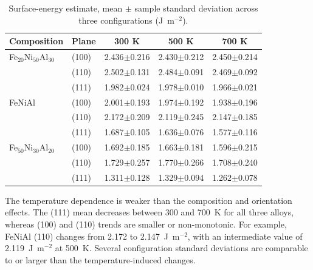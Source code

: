\begin{table}[t]
\centering
\caption{Surface-energy estimate, mean $\pm$ sample standard deviation across three configurations (J~m$^{-2}$).}
\label{tab:gamma}
\scriptsize
\begin{tabular}{llccc}
\toprule
Composition & Plane & 300 K & 500 K & 700 K \\
\midrule
Fe$_{20}$Ni$_{50}$Al$_{30}$ &(100)&2.436$\pm$0.216&2.430$\pm$0.212&2.450$\pm$0.214\\
 &(110)&2.502$\pm$0.131&2.484$\pm$0.091&2.469$\pm$0.092\\
 &(111)&1.982$\pm$0.024&1.978$\pm$0.010&1.966$\pm$0.021\\
\midrule
FeNiAl &(100)&2.001$\pm$0.193&1.974$\pm$0.192&1.938$\pm$0.196\\
 &(110)&2.172$\pm$0.209&2.119$\pm$0.245&2.147$\pm$0.185\\
 &(111)&1.687$\pm$0.105&1.636$\pm$0.076&1.577$\pm$0.116\\
\midrule
Fe$_{50}$Ni$_{30}$Al$_{20}$ &(100)&1.692$\pm$0.185&1.663$\pm$0.181&1.596$\pm$0.215\\
 &(110)&1.729$\pm$0.257&1.770$\pm$0.266&1.708$\pm$0.240\\
 &(111)&1.311$\pm$0.128&1.329$\pm$0.094&1.262$\pm$0.078\\
\bottomrule
\end{tabular}
\end{table}

The temperature dependence is weaker than the composition and orientation effects. The (111) mean decreases between 300 and 700~K for all three alloys, whereas (100) and (110) trends are smaller or non-monotonic. For example, FeNiAl (110) changes from 2.172 to 2.147~J~m$^{-2}$, with an intermediate value of 2.119~J~m$^{-2}$ at 500~K. Several configuration standard deviations are comparable to or larger than the temperature-induced changes.

